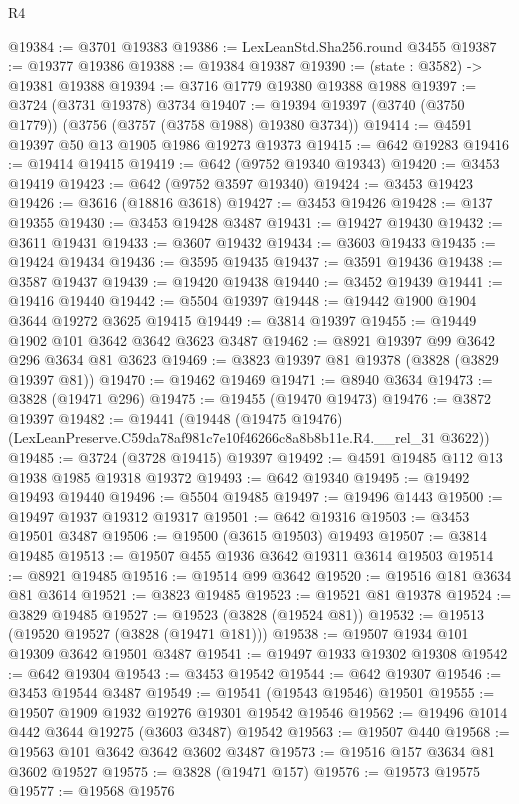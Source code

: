 \begin{lexlean}{R4}
\begin{coremodule}
@19384 := @3701 @19383
@19386 := LexLeanStd.Sha256.round @3455
@19387 := @19377 @19386
@19388 := @19384 @19387
@19390 := (state : @3582) -> @19381 @19388
@19394 := @3716 @1779 @19380 @19388 @1988
@19397 := @3724 (@3731 @19378) @3734
@19407 := @19394 @19397 (@3740 (@3750 @1779)) (@3756 (@3757 (@3758 @1988) @19380 @3734))
@19414 := @4591 @19397 @50 @13 @1905 @1986 @19273 @19373
@19415 := @642 @19283
@19416 := @19414 @19415
@19419 := @642 (@9752 @19340 @19343)
@19420 := @3453 @19419
@19423 := @642 (@9752 @3597 @19340)
@19424 := @3453 @19423
@19426 := @3616 (@18816 @3618)
@19427 := @3453 @19426
@19428 := @137 @19355
@19430 := @3453 @19428 @3487
@19431 := @19427 @19430
@19432 := @3611 @19431
@19433 := @3607 @19432
@19434 := @3603 @19433
@19435 := @19424 @19434
@19436 := @3595 @19435
@19437 := @3591 @19436
@19438 := @3587 @19437
@19439 := @19420 @19438
@19440 := @3452 @19439
@19441 := @19416 @19440
@19442 := @5504 @19397
@19448 := @19442 @1900 @1904 @3644 @19272 @3625 @19415
@19449 := @3814 @19397
@19455 := @19449 @1902 @101 @3642 @3642 @3623 @3487
@19462 := @8921 @19397 @99 @3642 @296 @3634 @81 @3623
@19469 := @3823 @19397 @81 @19378 (@3828 (@3829 @19397 @81))
@19470 := @19462 @19469
@19471 := @8940 @3634
@19473 := @3828 (@19471 @296)
@19475 := @19455 (@19470 @19473)
@19476 := @3872 @19397
@19482 := @19441
    (@19448 (@19475 @19476) (LexLeanPreserve.C59da78af981c7e10f46266c8a8b8b11e.R4.__rel_31 @3622))
@19485 := @3724 (@3728 @19415) @19397
@19492 := @4591 @19485 @112 @13 @1938 @1985 @19318 @19372
@19493 := @642 @19340
@19495 := @19492 @19493 @19440
@19496 := @5504 @19485
@19497 := @19496 @1443
@19500 := @19497 @1937 @19312 @19317
@19501 := @642 @19316
@19503 := @3453 @19501 @3487
@19506 := @19500 (@3615 @19503) @19493
@19507 := @3814 @19485
@19513 := @19507 @455 @1936 @3642 @19311 @3614 @19503
@19514 := @8921 @19485
@19516 := @19514 @99 @3642
@19520 := @19516 @181 @3634 @81 @3614
@19521 := @3823 @19485
@19523 := @19521 @81 @19378
@19524 := @3829 @19485
@19527 := @19523 (@3828 (@19524 @81))
@19532 := @19513 (@19520 @19527 (@3828 (@19471 @181)))
@19538 := @19507 @1934 @101 @19309 @3642 @19501 @3487
@19541 := @19497 @1933 @19302 @19308
@19542 := @642 @19304
@19543 := @3453 @19542
@19544 := @642 @19307
@19546 := @3453 @19544 @3487
@19549 := @19541 (@19543 @19546) @19501
@19555 := @19507 @1909 @1932 @19276 @19301 @19542 @19546
@19562 := @19496 @1014 @442 @3644 @19275 (@3603 @3487) @19542
@19563 := @19507 @440
@19568 := @19563 @101 @3642 @3642 @3602 @3487
@19573 := @19516 @157 @3634 @81 @3602 @19527
@19575 := @3828 (@19471 @157)
@19576 := @19573 @19575
@19577 := @19568 @19576

\end{coremodule}
\end{lexlean}
